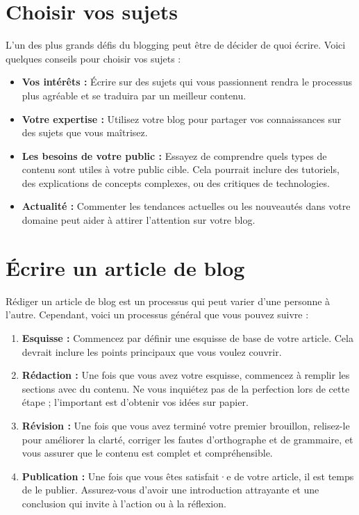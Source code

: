\section{Choisir vos sujets}

L'un des plus grands défis du blogging peut être de décider de quoi écrire. Voici quelques conseils pour choisir vos sujets :

\begin{itemize}
    \item \textbf{Vos intérêts :} Écrire sur des sujets qui vous passionnent rendra le processus plus agréable et se traduira par un meilleur contenu.
    \item \textbf{Votre expertise :} Utilisez votre blog pour partager vos connaissances sur des sujets que vous maîtrisez.
    \item \textbf{Les besoins de votre public :} Essayez de comprendre quels types de contenu sont utiles à votre public cible. Cela pourrait inclure des tutoriels, des explications de concepts complexes, ou des critiques de technologies.
    \item \textbf{Actualité :} Commenter les tendances actuelles ou les nouveautés dans votre domaine peut aider à attirer l'attention sur votre blog.
\end{itemize}


\section{Écrire un article de blog}

Rédiger un article de blog est un processus qui peut varier d'une personne à l'autre. Cependant, voici un processus général que vous pouvez suivre :

\begin{enumerate}
    \item \textbf{Esquisse :} Commencez par définir une esquisse de base de votre article. Cela devrait inclure les points principaux que vous voulez couvrir.
    \item \textbf{Rédaction :} Une fois que vous avez votre esquisse, commencez à remplir les sections avec du contenu. Ne vous inquiétez pas de la perfection lors de cette étape ; l'important est d'obtenir vos idées sur papier.
    \item \textbf{Révision :} Une fois que vous avez terminé votre premier brouillon, relisez-le pour améliorer la clarté, corriger les fautes d'orthographe et de grammaire, et vous assurer que le contenu est complet et compréhensible.
    \item \textbf{Publication :} Une fois que vous êtes satisfait·e de votre article, il est temps de le publier. Assurez-vous d'avoir une introduction attrayante et une conclusion qui invite à l'action ou à la réflexion.
\end{enumerate}

